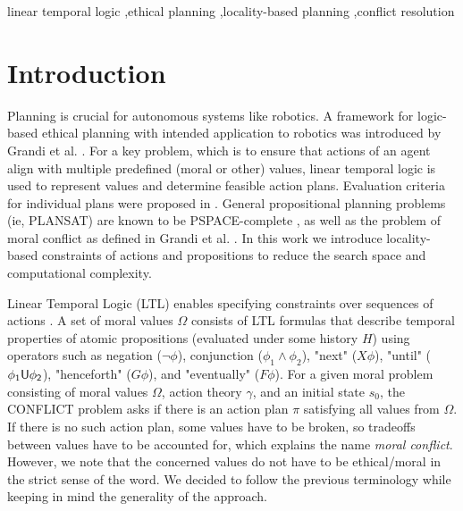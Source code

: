 \documentclass[a4paper,fleqn]{cas-dc}
\begin{document}
\begin{keywords}
linear temporal logic \sep ethical planning \sep locality-based planning \sep conflict resolution
\end{keywords}


\maketitle

\section{Introduction}

Planning is crucial for autonomous systems like robotics. A framework for logic-based ethical planning with intended application to robotics was introduced by Grandi et al. \cite{grandi2022logic}. For a key problem, which is to ensure that actions of an agent align with multiple predefined (moral or other) values, linear temporal logic is used to represent values and determine feasible action plans. Evaluation criteria for individual plans were proposed in \cite{grandi2023moral}. General propositional planning problems (ie, PLANSAT) are known to be PSPACE-complete \cite{BYLANDER1994165}, as well as the problem of moral conflict as defined in Grandi et al. \cite{grandi2022logic}. In this work we introduce locality-based constraints of actions and propositions to reduce the search space and computational complexity. 

Linear Temporal Logic (LTL) enables specifying constraints over sequences of actions \cite{10.5555/975331}.
A set of moral values $\Omega$ consists of LTL formulas \cite{4567924} that describe temporal properties of atomic propositions (evaluated under some history $H$) using operators such as negation ($\neg \phi$), conjunction ($\phi_1\land \phi_2$), "next" ($X\phi$), "until" ($\phi_1 \sf{U} \phi_2$), "henceforth" ($G\phi$), and "eventually" ($F\phi$). For a given moral problem consisting of moral values $\Omega$, action theory $\gamma$, and an initial state $s_0$, the CONFLICT problem asks if there is an action plan $\pi$ satisfying all values from $\Omega$. If there is no such action plan, some values have to be broken, so tradeoffs between values have to be accounted for, which explains the name {\it moral conflict}. However, we note that the concerned values do not have to be ethical/moral in the strict sense of the word. We decided to follow the previous terminology while keeping in mind the generality of the approach.
\end{document}
